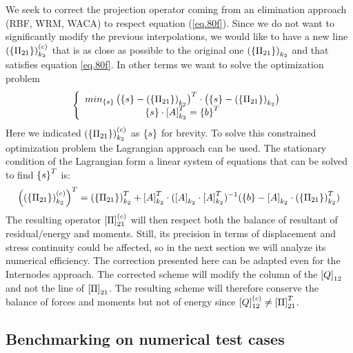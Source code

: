  We seek to correct the projection operator coming from an elimination approach (RBF, WRM, WACA) to respect equation (\ref{eq.80f}). Since we do not want to significantly modify the previous interpolations, we would like to have a new line  $ \left(\left\lbrace{\Pi_{21}}\right \rbrace\right)_{k_2}^{(c)}$ that is as close as possible to the original one  $ \left(\left\lbrace{\Pi_{21}}\right \rbrace\right)_{k_2}$ and that satisfies equation \ref{eq.80f}. In other terms we want to solve the optimization problem
 \begin{equation}
 \label{eq.80g}
\left\lbrace \begin{array}{c}
 min_{\left\lbrace{s}\right \rbrace}\left(\left\lbrace{s}\right \rbrace-\left(\left\lbrace{\Pi_{21}}\right \rbrace\right)_{k_2} \right)^T\cdot\left(\left\lbrace{s}\right \rbrace-\left(\left\lbrace{\Pi_{21}}\right \rbrace\right)_{k_2} \right)\\
 \left\lbrace{s}\right \rbrace\cdot\left[{A}\right]_{k_2}^T=\left\lbrace{b}\right \rbrace^T
 \end{array} \right.
 \end{equation}
 Here we indicated $ \left(\left\lbrace{\Pi_{21}}\right \rbrace\right)_{k_2}^{(c)}$ as $\left\lbrace{s}\right \rbrace$ for brevity. To solve this constrained optimization problem the Lagrangian approach can be used. The stationary condition of the Lagrangian form a linear system of equations that can be solved to find  $\left\lbrace{s}\right \rbrace^T$ is:
 \begin{equation}
 \label{eq.80h}
\left(\left(\left\lbrace{\Pi_{21}}\right \rbrace\right)_{k_2}^{(c)}\right)^T=\left(\left\lbrace{\Pi_{21}}\right \rbrace\right)_{k_2}^T+\left[{A}\right]_{k_2}^T\cdot(\left[{A}\right]_{k_2}\cdot\left[{A}\right]_{k_2}^T)^{-1}(\left\lbrace{b}\right \rbrace-\left[{A}\right]_{k_2}\cdot\left(\left\lbrace{\Pi_{21}}\right \rbrace\right)_{k_2}^T)
 \end{equation}
 The resulting operator $\left[{\Pi}\right]_{21}^{(c)}$ will then respect both the balance of resultant of residual/energy and moments. Still, its precision in terms of displacement and stress continuity could be affected, so in the next section we will analyze its numerical efficiency. The correction presented here can be adapted even for the Internodes approach. The corrected scheme will modify the column of the $\left[{Q}\right]_{12}$ and not the line of $\left[{\Pi}\right]_{21}$. The resulting scheme will therefore conserve the balance  of forces and moments but not of energy since $\left[{Q}\right]_{12}^{(c)}\neq\left[{\Pi}\right]_{21}^T$.
 \subsection{Benchmarking on numerical test cases}\label{sec4}
